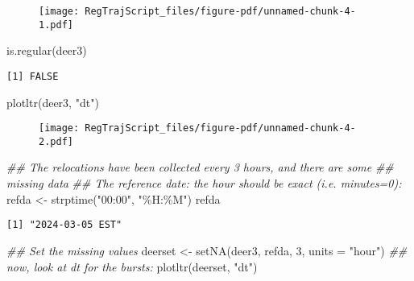 \documentclass[
  letterpaper,
]{book}
\newenvironment{Shaded}{\begin{snugshade}}{\end{snugshade}}
\newcommand{\AttributeTok}[1]{\textcolor[rgb]{0.40,0.45,0.13}{#1}}
\newcommand{\DecValTok}[1]{\textcolor[rgb]{0.68,0.00,0.00}{#1}}
\newcommand{\DocumentationTok}[1]{\textcolor[rgb]{0.37,0.37,0.37}{\textit{#1}}}
\newcommand{\FunctionTok}[1]{\textcolor[rgb]{0.28,0.35,0.67}{#1}}
\newcommand{\NormalTok}[1]{\textcolor[rgb]{0.00,0.23,0.31}{#1}}
\newcommand{\OtherTok}[1]{\textcolor[rgb]{0.00,0.23,0.31}{#1}}
\newcommand{\StringTok}[1]{\textcolor[rgb]{0.13,0.47,0.30}{#1}}
\begin{document}
\begin{figure}[H]

{\centering \texttt{[image: RegTrajScript\_files/figure-pdf/unnamed-chunk-4-1.pdf]}

}

\end{figure}

\begin{Shaded}
\begin{Highlighting}[]
\FunctionTok{is.regular}\NormalTok{(deer3)}
\end{Highlighting}
\end{Shaded}

\begin{verbatim}
[1] FALSE
\end{verbatim}

\begin{Shaded}
\begin{Highlighting}[]
\FunctionTok{plotltr}\NormalTok{(deer3, }\StringTok{"dt"}\NormalTok{)}
\end{Highlighting}
\end{Shaded}

\begin{figure}[H]

{\centering \texttt{[image: RegTrajScript\_files/figure-pdf/unnamed-chunk-4-2.pdf]}

}

\end{figure}

\begin{Shaded}
\begin{Highlighting}[]
\DocumentationTok{\#\# The relocations have been collected every 3 hours, and there are some}
\DocumentationTok{\#\# missing data}
\DocumentationTok{\#\# The reference date: the hour should be exact (i.e. minutes=0):}
\NormalTok{refda }\OtherTok{\textless{}{-}} \FunctionTok{strptime}\NormalTok{(}\StringTok{"00:00"}\NormalTok{, }\StringTok{"\%H:\%M"}\NormalTok{)}
\NormalTok{refda}
\end{Highlighting}
\end{Shaded}

\begin{verbatim}
[1] "2024-03-05 EST"
\end{verbatim}

\begin{Shaded}
\begin{Highlighting}[]
\DocumentationTok{\#\# Set the missing values}
\NormalTok{deerset }\OtherTok{\textless{}{-}} \FunctionTok{setNA}\NormalTok{(deer3, refda, }\DecValTok{3}\NormalTok{, }\AttributeTok{units =} \StringTok{"hour"}\NormalTok{)}
\DocumentationTok{\#\# now, look at dt for the bursts:}
\FunctionTok{plotltr}\NormalTok{(deerset, }\StringTok{"dt"}\NormalTok{)}
\end{Highlighting}
\end{Shaded}
\end{document}
